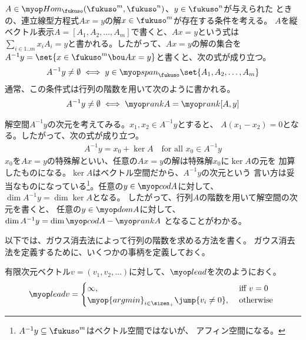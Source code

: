 	$A\in\Hom_\fukuso(\fukuso^m,\fukuso^n)$、$y\in\fukuso^n$が与えられた
	ときの、連立線型方程式$Ax=y$の解$x\in\fukuso^m$が存在する条件を考える。
	$A$を縦ベクトル表示$A=[A_1,A_2,\dots,A_m]$で書くと、$Ax=y$という式は
	$\sum_{i\in1..m}x_iA_i=y$と書かれる。したがって、$Ax=y$の解の集合を
	$A^{-1}y=\set{x\in\fukuso^m\bou Ax=y}$と書くと、次の式が成り立つ。
	\begin{equation*}\begin{split} %
		A^{-1}y\neq\emptyset \iff y\in\spanall_\fukuso\set{A_1,A_2,\dots,A_m}
	\end{split}\end{equation*} %
	通常、この条件式は行列の階数を用いて次のように書かれる。
	\begin{equation*}\begin{split} %
		A^{-1}y\neq\emptyset \iff \rank A = \rank[A, y]
	\end{split}\end{equation*} %

	解空間$A^{-1}y$の次元を考えてみる。$x_1,x_2\in A^{-1}y$とすると、
	$A(x_1-x_2)=0$となる。したがって、次の式が成り立つ。
	\begin{equation*}\begin{split} %
		A^{-1}y = x_0 + \ker A \quad\text{for all }x_0\in A^{-1} y
	\end{split}\end{equation*} %
	$x_0$を$Ax=y$の特殊解といい、任意の$Ax=y$の解は特殊解$x_0$に$\ker A$の元を
	加算したものになる。$\ker A$はベクトル空間だから、$A^{-1}y$の次元という
	言い方は妥当なものになっている\footnote{
		$A^{-1}y\subseteq\fukuso^m$はベクトル空間ではないが、
		アフィン空間になる。
	}。任意の$y\in\codom A$に対して、$\dim A^{-1}y=\dim\ker A$となる。
	したがって、行列$A$の階数を用いて解空間の次元を書くと、
	任意の$y\in\dom A$に対して、$\dim A^{-1}y=\dim\codom A-\rank A$
	となることがわかる。

	以下では、ガウス消去法によって行列の階数を求める方法を書く。
	ガウス消去法を定義するために、いくつかの事柄を定義しておく。

	有限次元ベクトル$v=(v_1,v_2,\dots)$に対して、$\lead$を次のようにおく。
	\begin{equation*}\begin{split} %
		\lead v = \begin{cases}
			\infty, &\text{ iff } v = 0 \\
			\myop{argmin}_{i\in\sizen_+}\jump{v_i\neq 0}, &\text{ otherwise } \\
		\end{cases}
	\end{split}\end{equation*} %

